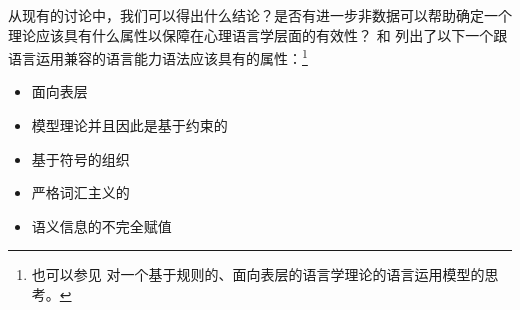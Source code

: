 从现有的讨论中，我们可以得出什么结论？是否有进一步非数据可以帮助确定一个理论应该具有什么属性以保障在心理语言学层面的有效性？ \citet*{SWB2003a}和 \citet{SW2011a,SW2015a}列出了以下一个跟语言运用兼容的语言能力语法应该具有的属性：\footnote{%
也可以参见 对一个基于规则的、面向表层的语言学理论的语言运用模型的思考。  
}
\begin{itemize}
\item 面向表层
\item 模型理论并且因此是基于约束的
\item 基于符号的组织
\item 严格词汇主义的
\item 语义信息的不完全赋值
\end{itemize}

